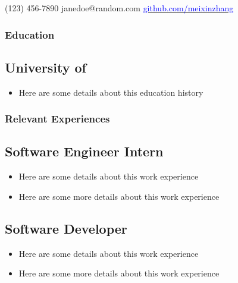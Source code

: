 \documentclass{mxresume}
\begin{document}
\contact
    {(123) 456-7890 }
    {janedoe@random.com}
    {\href{https://github.com/meixinzhang} {\textcolor{blue}{github.com/meixinzhang}}}
    {}{}
\vspace*{2mm}
\subsubsection*{\Large{Education}} %
\subsection*{University of } 
\begin{itemize}[leftmargin=5mm]
\setlength{\itemsep}{0mm}
\item Here are some details about this education history
\end{itemize}
\subsubsection*{\Large{Relevant Experiences}} %
\subsection*{Software Engineer Intern}
\begin{itemize}[leftmargin=5mm]
\setlength{\itemsep}{0mm}
\item Here are some details about this work experience
\item Here are some more details about this work experience
\end{itemize}
\subsection*{Software Developer}
\begin{itemize}[leftmargin=5mm]
\setlength{\itemsep}{0mm}
\item Here are some details about this work experience
\item Here are some more details about this work experience
\end{itemize}
\end{document}
